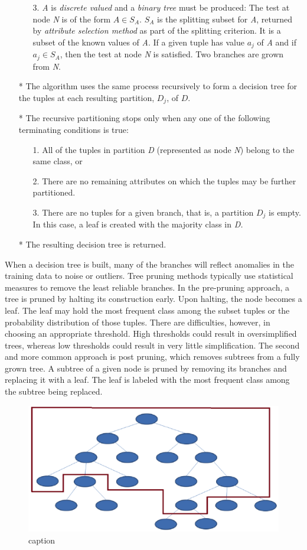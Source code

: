 \begin{itemize}
\begin{itemize}
\item[3.] \textit{A} is \textit{discrete valued} and a \textit{binary tree} must be produced:  The test at node \textit{N} is of the form $A \in S_{A}$.  $S_{A}$ is the splitting subset for \textit{A}, returned by \textit{attribute selection method} as part of the splitting criterion. It is a subset of the known values of \textit{A}.  If a given tuple has value $a_{j}$ of \textit{A} and if $a_{j} \in S_{A}$, then the test at node \textit{N} is satisfied.  Two branches are grown from \textit{N}.
\end{itemize}
\item[*] The algorithm uses the same process recursively to form a decision tree for the tuples at each resulting partition, $D_{j}$, of $D$.
\item[*] The recursive partitioning stops only when any one of the following terminating conditions is true:
\begin{itemize}
\item[1.] All of the tuples in partition \textit{D} (represented as node \textit{N}) belong to the same class, or
\item[2.] There are no remaining attributes on which the tuples may be further partitioned.
\item[3.] There are no tuples for a given branch, that is, a partition $D_{j}$ is empty.  In this case, a leaf is created with the majority class in \textit{D.}
\end{itemize}
\item[*] The resulting decision tree is returned.
\end{itemize}
When a decision tree is built, many of the branches will reflect anomalies in the training data  to noise or outliers.
Tree pruning methods typically use statistical measures to remove the least reliable branches.
In the pre-pruning approach, a tree is pruned by halting its construction early.
Upon halting, the node becomes a leaf. The leaf may hold the most frequent class among the subset tuples or the probability distribution of those tuples.
There are difficulties, however, in choosing an appropriate threshold.
High thresholds could result in oversimplified trees, whereas low thresholds could result in very little simplification.
The second and more common approach is post pruning, which removes subtrees from a fully grown tree.  A subtree of a given node is pruned by removing its branches and replacing it with a leaf.  The leaf is labeled with the most frequent class among the subtree being replaced.

\begin{figure}[ht!]
  \centering
  \includegraphics[scale=0.6]{arbolpoda}
  \caption{caption}

\end{figure}

%
